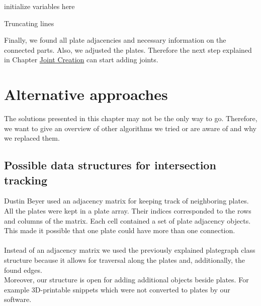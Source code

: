 \documentclass[../ClassicThesis.tex]{subfiles}
\begin{document}
\begin{algorithm}[H]
	\DontPrintSemicolon
	initialize variables here\;
  	\caption{Truncating lines}
  	\label{truncateLines}
\end{algorithm}

Finally, we found all plate adjacencies and necessary information on the connected parts. Also, we adjusted the plates. Therefore the next step explained in Chapter \hyperref[ch:joints]{Joint Creation} can start adding joints.

\section{Alternative approaches}
The solutions presented in this chapter may not be the only way to go. Therefore, we want to give an overview of other algorithms we tried or are aware of and why we replaced them.

\subsection{Possible data structures for intersection tracking}
Dustin Beyer \citeauthor{master-thesis} used an adjacency matrix for keeping track of neighboring plates. All the plates were kept in a plate array. Their indices corresponded to the rows and columns of the matrix. Each cell contained a set of plate adjacency objects. This made it possible that one plate could have more than one connection.\\
\*\\
Instead of an adjacency matrix we used the previously explained plategraph class structure because it allows for traversal along the plates and, additionally, the found edges. \\
Moreover, our structure is open for adding additional objects beside plates. For example 3D-printable snippets which were not converted to plates by our software.
\end{document}
